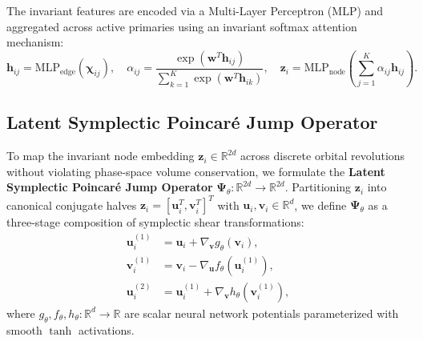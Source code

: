 \documentclass[preprint,12pt,3p]{elsarticle}
\begin{document}
The invariant features are encoded via a Multi-Layer Perceptron (MLP) and aggregated across active primaries using an invariant softmax attention mechanism:
\begin{equation}
\bm{h}_{ij} = \mathrm{MLP}_{\mathrm{edge}}(\bm{\chi}_{ij}), \quad \alpha_{ij} = \frac{\exp(\bm{w}^T \bm{h}_{ij})}{\sum_{k=1}^{K} \exp(\bm{w}^T \bm{h}_{ik})}, \quad \bm{z}_i = \mathrm{MLP}_{\mathrm{node}}\left( \sum_{j=1}^{K} \alpha_{ij} \bm{h}_{ij} \right).
\label{eq:attention_aggregation}
\end{equation}

\subsection{Latent Symplectic Poincaré Jump Operator}
To map the invariant node embedding $\bm{z}_i \in \mathbb{R}^{2d}$ across discrete orbital revolutions without violating phase-space volume conservation, we formulate the \textbf{Latent Symplectic Poincaré Jump Operator} $\bm{\Psi}_{\theta}: \mathbb{R}^{2d} \to \mathbb{R}^{2d}$. Partitioning $\bm{z}_i$ into canonical conjugate halves $\bm{z}_i = [\bm{u}_i^T, \bm{v}_i^T]^T$ with $\bm{u}_i, \bm{v}_i \in \mathbb{R}^d$, we define $\bm{\Psi}_{\theta}$ as a three-stage composition of symplectic shear transformations:
\begin{align}
\bm{u}_i^{(1)} &= \bm{u}_i + \nabla_{\bm{v}} g_{\theta}(\bm{v}_i), \label{eq:shear1} \\
\bm{v}_i^{(1)} &= \bm{v}_i - \nabla_{\bm{u}} f_{\theta}(\bm{u}_i^{(1)}), \label{eq:shear2} \\
\bm{u}_i^{(2)} &= \bm{u}_i^{(1)} + \nabla_{\bm{v}} h_{\theta}(\bm{v}_i^{(1)}), \label{eq:shear3}
\end{align}
where $g_{\theta}, f_{\theta}, h_{\theta}: \mathbb{R}^d \to \mathbb{R}$ are scalar neural network potentials parameterized with smooth $\tanh$ activations.
\end{document}

